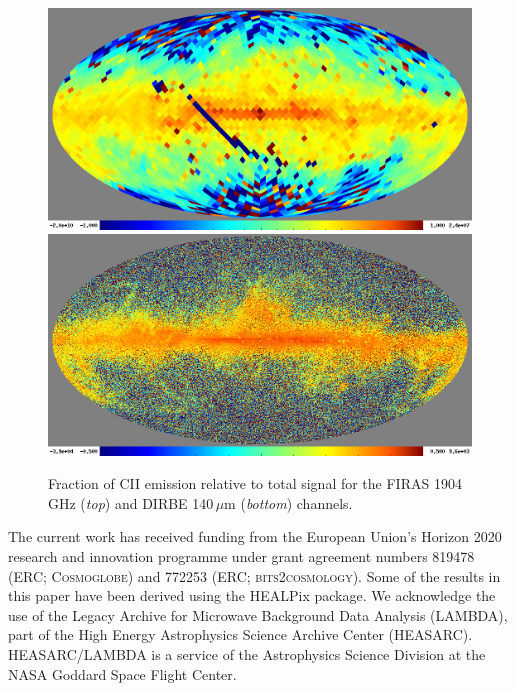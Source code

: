 \documentclass{aa}
\begin{document}
\begin{figure}
    \centering
    \includegraphics[width=\columnwidth]{figures/ratio_FIRAS_H1904.png}\\
    \includegraphics[width=\columnwidth]{figures/ratio_09.png}
    \caption{Fraction of CII emission relative to total signal for the FIRAS 1904\,GHz (\emph{top}) and DIRBE 140\,$\mu$m (\emph{bottom}) channels.}
    \label{fig:scatter_cg_firas}
\end{figure}



\blindtext





\begin{acknowledgements}
 The current work has received funding from the European
  Union’s Horizon 2020 research and innovation programme under grant
  agreement numbers 819478 (ERC; \textsc{Cosmoglobe}) and 772253 (ERC;
  \textsc{bits2cosmology}). Some of the results in this paper have been derived using the HEALPix \citep{HEALPIX} package.
  We acknowledge the use of the Legacy Archive for Microwave Background Data
  Analysis (LAMBDA), part of the High Energy Astrophysics Science Archive Center
  (HEASARC). HEASARC/LAMBDA is a service of the Astrophysics Science Division at
  the NASA Goddard Space Flight Center.  
\end{acknowledgements}


%



\end{document}
